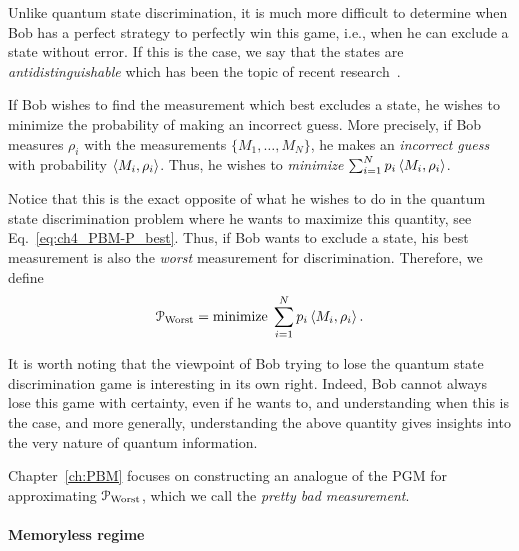 Unlike quantum state discrimination, it is much more difficult to determine when Bob has a perfect strategy to perfectly win this game, i.e., when he can exclude a state without error. 
If this is the case, we say that the states are \emph{antidistinguishable} which has been the topic of recent research~\cite{havlivcek2020simple, russo2023inner, leifer2020noncontextuality, mishra2023optimal, uola2020all, johnston2023tight}. 

If Bob wishes to find the measurement which best excludes a state, he wishes to minimize the probability of making an incorrect guess.
More precisely, if Bob measures $\rho_i$ with the measurements $\{M_1, \ldots, M_N\}$, he makes an \emph{incorrect guess} with probability $\left\langle M_i, \rho_i \right\rangle$.  
Thus, he wishes to \emph{minimize} 
$\sum_{i=1}^N p_i \left\langle M_i, \rho_i \right\rangle$.  

Notice that this is the exact opposite of what he wishes to do in the quantum state discrimination problem where he wants to maximize this quantity, see Eq.~\eqref{eq:ch4_PBM-P_best}. 
Thus, if Bob wants to exclude a state, his best measurement is also the \emph{worst} measurement for discrimination. 
Therefore, we define 
\begin{equation}
    \label{eq:ch4_PBM-P_worst}
    \mathcal{P}_{\mathrm{Worst}} = \text{minimize} \; \sum_{i=1}^N p_i \left\langle M_i, \rho_i \right\rangle. 
\end{equation}

It is worth noting that the viewpoint of Bob trying to lose the quantum state discrimination game is interesting in its own right. 
Indeed, Bob cannot always lose this game with certainty, even if he wants to, and understanding when this is the case, and more generally, understanding the above quantity gives insights into the very nature of quantum information.

Chapter~\ref{ch:PBM} focuses on constructing an analogue of the PGM for approximating $\mathcal{P}_{\mathrm{Worst}}$, which we call the \emph{pretty bad measurement}.


\paragraph{Memoryless regime}

